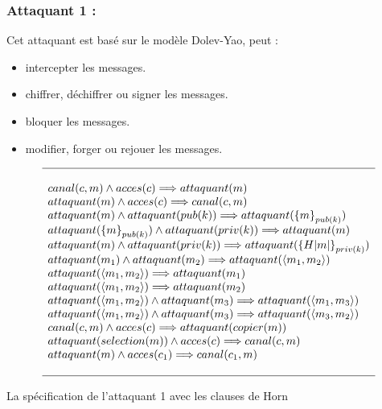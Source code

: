 \documentclass[10pt,a4paper]{article}
\begin{document}
\subsubsection{Attaquant 1 :}
Cet attaquant est basé sur le modèle Dolev-Yao, peut :
\begin{itemize}
\item intercepter les messages.
\item chiffrer, déchiffrer ou signer les messages.
\item bloquer les messages.
\item modifier, forger ou rejouer les messages.\\
\end{itemize}
\[
\begin{array}{l}
\hline
\\
canal(c,m)\wedge acces(c)\Longrightarrow attaquant(m)\\
attaquant(m)\wedge acces(c)\Longrightarrow canal(c,m)\\
attaquant(m)\wedge attaquant(pub(k))\Longrightarrow attaquant({\lbrace m\rbrace}_{pub(k)})
\\
attaquant({\lbrace m\rbrace}_{pub(k)}) \wedge attaquant(priv(k))\Longrightarrow attaquant(m) 
\\ 
attaquant(m)\wedge attaquant(priv(k))\Longrightarrow attaquant({\lbrace H|m|\rbrace}_{priv(k)})
\\
attaquant(m_{1})\wedge attaquant(m_{2})\Longrightarrow attaquant(\langle m_{1},m_{2}\rangle)\\ 
attaquant(\langle m_{1},m_{2}\rangle)\Longrightarrow attaquant(m_{1})\\ 
attaquant(\langle m_{1},m_{2}\rangle)\Longrightarrow attaquant(m_{2})\\ 
attaquant(\langle m_{1},m_{2}\rangle)\wedge attaquant(m_{3})\Longrightarrow attaquant(\langle m_{1},m_{3}\rangle)\\ 
attaquant(\langle m_{1},m_{2}\rangle)\wedge attaquant(m_{3})\Longrightarrow attaquant(\langle m_{3},m_{2}\rangle)\\ 
canal(c,m)\wedge acces(c)\Longrightarrow attaquant(copier(m))\\
attaquant(selection(m))\wedge acces(c)\Longrightarrow canal(c,m)\\ 
attaquant(m)\wedge acces(c_{1})\Longrightarrow canal(c_{1},m)\\
\\ 
\hline
\end{array}
\]
\caption{La spécification de l'attaquant 1 avec les clauses de Horn}
\end{document}
